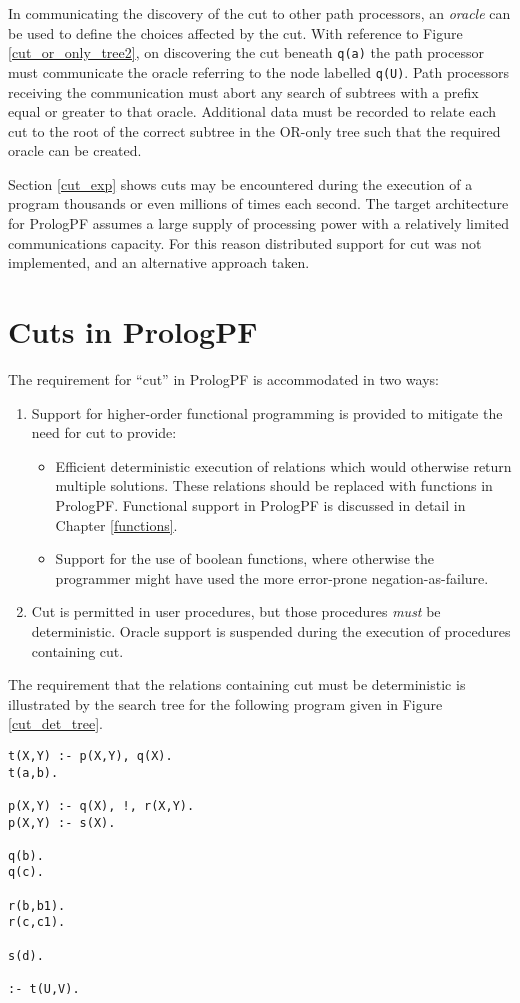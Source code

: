 In communicating the discovery of the cut to other path processors, an \textit{oracle} can
be used to define the choices affected by the cut.  With reference to 
Figure \ref{cut_or_only_tree2}, on discovering the cut beneath \texttt{q(a)} the path
processor must communicate the oracle referring to the node labelled \texttt{q(U)}. Path
processors receiving the communication must abort any search of subtrees with a prefix
equal or greater to that oracle.  Additional data must be recorded to relate each cut to
the root of the correct subtree in the OR-only tree such that the required oracle
can be created.

Section \ref{cut_exp} shows cuts may be encountered during the execution of a program thousands
or even millions of times each second.  The target architecture for PrologPF assumes a large
supply of processing power with a relatively limited communications capacity.  For this 
reason distributed support for cut was not implemented, and an alternative approach taken.

\section{Cuts in PrologPF} %

The requirement for ``cut'' in PrologPF is accommodated in two ways:
\begin{enumerate}
\item{Support for higher-order functional programming is provided to mitigate the need for
  cut to provide:
  \begin{itemize}
  \item{Efficient deterministic execution of relations which would otherwise return
    multiple solutions.
    These relations should be replaced with functions in PrologPF.  Functional support in
    PrologPF is discussed in detail in Chapter \ref{functions}.}
  \item{Support for the use of boolean functions, where otherwise the programmer might have
    used the more error-prone negation-as-failure.}
  \end{itemize}}
\item{Cut is permitted in user procedures, but those procedures \textit{must} be deterministic.
  Oracle support is suspended during the execution of procedures containing cut.}
\end{enumerate}

The requirement that the relations containing cut must be deterministic is illustrated by
the search tree for the following program given in Figure \ref{cut_det_tree}.
\begin{verbatim}
t(X,Y) :- p(X,Y), q(X).
t(a,b).

p(X,Y) :- q(X), !, r(X,Y).
p(X,Y) :- s(X).

q(b).
q(c).

r(b,b1).
r(c,c1).

s(d).

:- t(U,V).
\end{verbatim}

